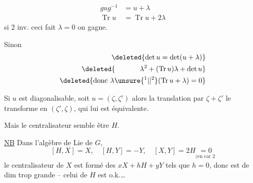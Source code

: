 \[
\begin{aligned}
 gug^{-1}&=u+\lambda\\
 \operatorname{Tr}u&=\operatorname{Tr}u+2\lambda
\end{aligned}
\]
si 2 inv. ceci fait $\lambda=0$ on gagne.

Sinon  
\[
\begin{aligned}
 \deleted{\det u=\det(u+\lambda)}\\
 \deleted{\phantom{\det u={}}\lambda^2+(\operatorname{Tr}u)\lambda+\det u}\\
 \deleted{\text{donc }\lambda\unsure{{}^{1}|{}|{}^{2}}(\operatorname{Tr}u+\lambda)=0}
\end{aligned}
\]

Si $u$ est diagonalisable, soit $u=(\zeta,\zeta')$ alors la translation par $\zeta+\zeta'$ le transforme en $(\zeta',\zeta)$, qui lui est équivalente.

Mais le centralisateur  semble être  $H$.

  \uline{NB} Dans l'algèbre de Lie de $G$,  
\[
 [H,X]=X,\quad [H,Y]=-Y,\quad [X,Y]=2H\underset{\text{(en car 2}}{=0}
\]
le centralisateur de $X$   est formé des $xX+hH+yY$ tels que $h=0$, donc est de dim trop grande -- celui de $H$ est o.k.\ldots

